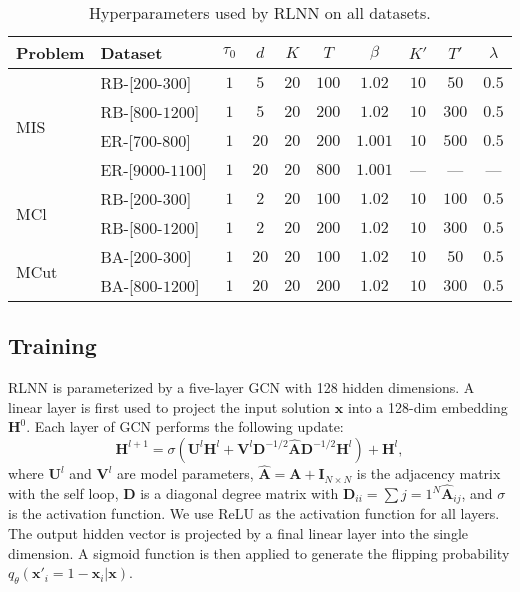 \begin{table*}[ht!]
    \centering
        \caption{Hyperparameters used by RLNN on all datasets.}
    \begin{tabular}{ll|cccccccc}
    \toprule
    Problem & Dataset & $\tau_0$ & $d$ & $K$ & $T$ & $\beta$ & $K'$ & $T'$ & $\lambda $\\
    \midrule 
     \multirow{4}{*}{MIS} & RB-[$200$-$300$] & $1$ & $5$  & $20$ & $100$ & $1.02$  & $10$ & $50$ & $0.5$\\
         &  RB-[$800$-$1200$]& $1$ & $5$  & $20$ & $200$  & $1.02$ & $10$ & $300$ & $0.5$\\
         &  ER-[$700$-$800$] & $1$ & $20$  & $20$ & $200$ & $1.001$ & $10$ & $500$ & $0.5$\\
         & ER-[$9000$-$1100$]& $1$ & $20$   & $20$ & $800$ & $1.001$ &
--- & --- & --- \\
         \midrule
     \multirow{2}{*}{MCl} & RB-[$200$-$300$] & $1$ & $2$ & $20$ & $100$  & $1.02$ &  $10$ & $100$ & $0.5$ \\
     &  RB-[$800$-$1200$]& $1$ & $2$ & $20$ & $200$  & $1.02$ & $10$ & $300$ & $0.5$\\
     \midrule
     \multirow{2}{*}{MCut} & BA-[$200$-$300$] & $1$ & $20$ & $20$ & $100$  & $1.02$ & $10$ & $50$ & $0.5$ \\
     &  BA-[$800$-$1200$] & $1$  & $20$ & $20$ & $200$  & $1.02$ & $10$ & $300$ & $0.5$\\
    \bottomrule     
    \end{tabular}
    \label{tab:hyper_rlnn}
\end{table*}
\subsection{Training}
RLNN is parameterized by a five-layer GCN \citep{Welling2011LD} with 128 hidden dimensions. A linear layer is first used to project the input solution $\mathbf{x}$ into a 128-dim embedding $\mathbf{H}^0$. Each layer of GCN performs the following update:
\begin{equation}
    \mathbf{H}^{l+1}=\sigma(\mathbf{U}^l\mathbf{H}^l+\mathbf{V}^l\mathbf{D}^{-1/2}\hat{\mathbf{A}}\mathbf{D}^{-1/2}\mathbf{H}^l) +
    \mathbf{H}^l,
\end{equation}
where $\mathbf{U}^l$ and $\mathbf{V}^l$ are model parameters, $\hat{\mathbf{A}}=\mathbf{A}+\mathbf{I}_{N\times N}$ is the adjacency matrix with the self loop, $\mathbf{D}$ is a diagonal degree matrix with $\mathbf{D}_{ii}=\sum{j=1}^N\hat{\mathbf{A}}_{ij}$, and $\sigma$ is the activation function. We use ReLU as the activation function for all layers. The output hidden vector is projected by a final linear layer into the single dimension. A sigmoid function is then applied to generate the flipping probability $q_{\theta}(\mathbf{x}'_i=1-\mathbf{x}_i|\mathbf{x})$. 

